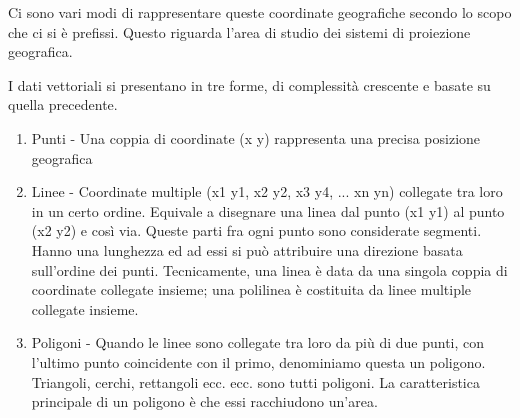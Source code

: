 Ci sono vari modi di rappresentare queste coordinate geografiche secondo
lo scopo che ci si è prefissi. Questo riguarda l'area di studio dei
sistemi di proiezione geografica.

I dati vettoriali si presentano in tre forme, di complessità crescente
e basate su quella precedente.
\begin{enumerate}
\item Punti - Una coppia di coordinate (x y) rappresenta una precisa posizione geografica
\item Linee - Coordinate multiple (x1 y1, x2 y2, x3 y4, ... xn yn) collegate
tra loro in un certo ordine. Equivale a disegnare una linea dal punto (x1 y1)
al punto (x2 y2) e così via. Queste parti fra ogni punto sono considerate segmenti.
Hanno una lunghezza ed ad essi si può attribuire una direzione basata sull’ordine
dei punti. Tecnicamente, una linea è data da una singola coppia di coordinate
collegate insieme; una polilinea è costituita da linee multiple collegate insieme.
\item Poligoni - Quando le linee sono collegate tra loro da più di due punti,
con l'ultimo punto coincidente con il primo, denominiamo questa un poligono.
Triangoli, cerchi, rettangoli ecc. ecc. sono tutti poligoni. La caratteristica
principale di un poligono è che essi racchiudono un'area. 
\end{enumerate}

